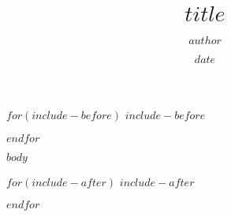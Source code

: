 \documentclass[12pt,a4paper]{book}
\author{$author$}
\title{$title$}
\date{$date$}
\begin{document}
\frontmatter
{}







$for(include-before)$
$include-before$

$endfor$

\tableofcontents
\listoffigures
\listoftables



\mainmatter

$body$




\backmatter

$for(include-after)$
$include-after$

$endfor$
\end{document}
